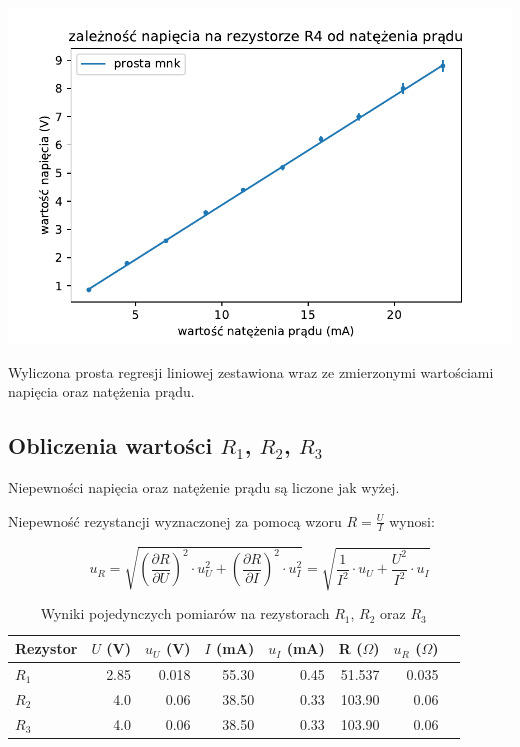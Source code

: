 \documentclass[a4paper]{article}
\begin{document}
\begin{table}
\centering
\includegraphics[scale=0.7]{fig_d.pdf}
\caption{Wyliczona prosta regresji liniowej zestawiona wraz ze zmierzonymi wartościami napięcia oraz natężenia prądu.}
\end{table}

\subsection{Obliczenia wartości $R_1$, $R_2$, $R_3$}

Niepewności napięcia oraz natężenie prądu są liczone jak wyżej.

Niepewność rezystancji wyznaczonej za pomocą wzoru $R = \frac{U}{I}$ wynosi:

$$u_R = \sqrt{(\frac{\partial R}{\partial U})^2 \cdot u_U^2 + (\frac{\partial R}{\partial I})^2 \cdot u_I^2} = \sqrt{\frac{1}{I^2} \cdot u_U + \frac{U^2}{I^2} \cdot u_I}$$

\begin{table}
\centering
\begin{tabular}{lrrrrrrl}
\toprule
Rezystor &  $U$ (V) &  $u_U$ (V) &  $I$ (mA) &  $u_I$ (mA) &  R ($\Omega$) &  $u_R$ ($\Omega$) \\
\midrule
$R_1$ &          2.85 &           0.018 &                  55.30 &              0.45 &             51.537 &             0.035 \\
$R_2$ &          4.0 &           0.06 &                  38.50 &              0.33 &            103.90 &             0.06 \\
$R_3$ &          4.0 &           0.06 &                  38.50 &              0.33 &            103.90 &             0.06 \\
\bottomrule
\end{tabular}
\caption{Wyniki pojedynczych pomiarów na rezystorach $R_1$, $R_2$ oraz $R_3$}
\end{table}
\end{document}
